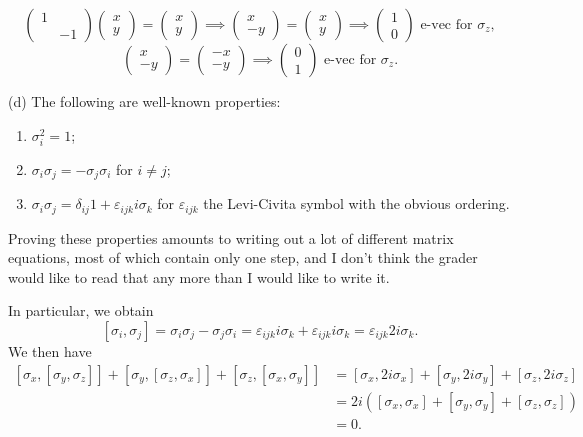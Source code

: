 \documentclass[11pt, letterpaper]{article}
\begin{document}
\[
	\begin{pmatrix}
	1 &  \\
	 & -1
	\end{pmatrix}\begin{pmatrix}
	x \\
	y
	\end{pmatrix}=\begin{pmatrix}
	x \\
	y
	\end{pmatrix}\implies \begin{pmatrix}
	x \\
	-y
	\end{pmatrix}=\begin{pmatrix}
	x \\
	y
	\end{pmatrix}\implies \begin{pmatrix}
	1 \\
	0
	\end{pmatrix}\text{ e-vec for } \sigma _z,
\]
\[
	\begin{pmatrix}
	x \\
	-y
	\end{pmatrix}=\begin{pmatrix}
	-x \\
	-y
	\end{pmatrix}\implies \begin{pmatrix}
	0 \\
	1
	\end{pmatrix}\text{ e-vec for } \sigma _z
.\]


(d) The following are well-known properties:
\begin{enumerate}
	\item $\sigma _i^2=1$;
	\item $\sigma _i\sigma _j=-\sigma _j\sigma _i$ for $i\neq j$;
	\item $\sigma _i\sigma _j=\delta _{ij} 1+\varepsilon _{ijk} i\sigma _k$ for $\varepsilon_{ijk} $ the Levi-Civita symbol with the obvious ordering.
\end{enumerate}
Proving these properties amounts to writing out a lot of different matrix equations, most of which contain only one step, and I don't think the grader would like to read that any more than I would like to write it.

In particular, we obtain
\[
	\left[ \sigma _i,\sigma _j \right] =\sigma _i\sigma _j-\sigma _j\sigma _i=\varepsilon_{ijk} i\sigma _k + \varepsilon_{ijk} i\sigma _k=\varepsilon_{ijk} 2i\sigma _k
.\]
We then have
\begin{align*}
	\left[ \sigma _x,\left[ \sigma _y,\sigma _z \right]  \right] +\left[ \sigma _y,\left[ \sigma _z,\sigma _x \right]  \right] +\left[ \sigma _z,\left[ \sigma _x,\sigma _y \right]  \right] &=\left[ \sigma _x,2i\sigma _x \right] +\left[ \sigma _y,2i\sigma _y \right] +\left[ \sigma _z,2i\sigma _z \right] \\
																								 &=2i\left( \left[ \sigma _x,\sigma _x \right] +\left[ \sigma _y,\sigma _y \right] +\left[ \sigma _z,\sigma _z \right]  \right) \\
																								 &=0
.\end{align*}
\end{document}
